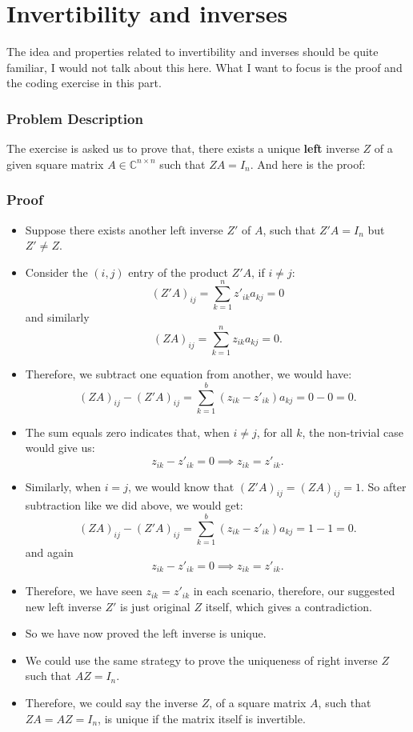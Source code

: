 \section{Invertibility and inverses}%
The idea and properties related to invertibility and inverses should be quite familiar, I would not talk about this here. What I want to focus is the proof and the coding exercise in this part.
\subsubsection*{Problem Description}
The exercise is asked us to prove that, there exists a unique \textbf{left} inverse $Z$ of a given square matrix $A \in \mathbb{C}^{n \times n}$ such that $ZA = I_n$. And here is the proof:
\subsubsection*{Proof}
\begin{itemize}
  \item Suppose there exists another left inverse $Z'$ of $A$, such that  $Z'A = I_n$ but  $Z' \neq  Z$.
  \item Consider the $(i, j)$ entry of the product $Z'A$, if $i \neq j$:
    \[
      (Z'A)_{ij} = \sum_{k=1}^{n} z'_{ik}a_{kj} = 0
    \]
    and similarly
    \[
      (ZA)_{ij} = \sum_{k=1}^{n} z_{ik}a_{kj} = 0
    .\]
  \item Therefore, we subtract one equation from another, we would have:
    \[
      (ZA)_{ij} - (Z'A)_{ij} = \sum_{k=1}^{b} (z_{ik} - z'_{ik})a_{kj} = 0 - 0 = 0
    .\]
  \item The sum equals zero indicates that, when $i \neq  j$, for all $k$, the non-trivial case would give us:
     \[
    z_{ik} - z'_{ik} = 0 \implies z_{ik} = z'_{ik}
    .\] 
  \item Similarly, when $i = j$, we would know that  $(Z'A)_{ij} = (ZA)_{ij} = 1$. So after subtraction like we did above, we would get:
    \[
      (ZA)_{ij} - (Z'A)_{ij} = \sum_{k=1}^{b} (z_{ik} - z'_{ik})a_{kj} = 1 - 1 = 0
    .\]
    and again
    \[
    z_{ik} - z'_{ik} = 0 \implies z_{ik} = z'_{ik}
    .\] 
  \item Therefore, we have seen $z_{ik} = z'_{ik}$ in each scenario, therefore, our suggested new left inverse $Z'$ is just original $Z$ itself, which gives a contradiction.
   \item So we have now proved the left inverse is unique.
  \item We could use the same strategy to prove the uniqueness of right inverse $Z$ such that  $AZ = I_n$.
  \item Therefore, we could say the inverse $Z$, of a square matrix $A$, such that  $ZA = AZ = I_n$, is unique if the matrix itself is invertible.
\end{itemize}
